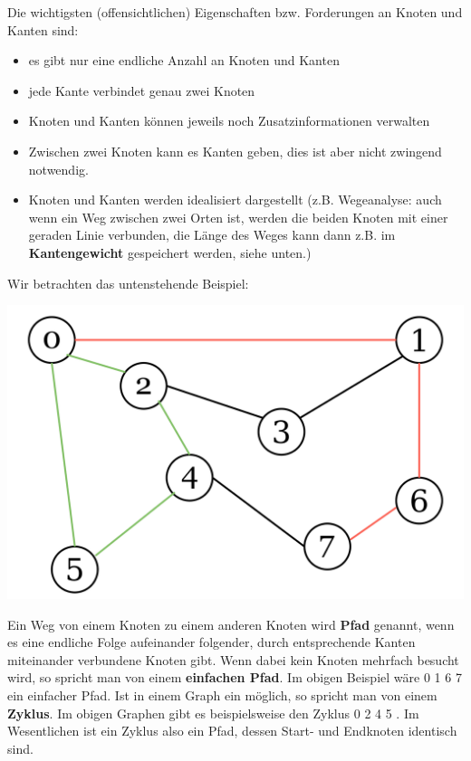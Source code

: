 \documentclass{article}
\begin{document}
Die wichtigsten (offensichtlichen) Eigenschaften bzw. Forderungen an Knoten und Kanten sind:
\begin{itemize}
    \item es gibt nur eine endliche Anzahl an Knoten und Kanten 
    \item jede Kante verbindet genau zwei Knoten 
    \item Knoten und Kanten können jeweils noch Zusatzinformationen verwalten
    \item Zwischen zwei Knoten kann es Kanten  geben, dies ist aber nicht zwingend notwendig. 
    \item Knoten und Kanten werden idealisiert dargestellt (z.B. Wegeanalyse: auch wenn ein Weg zwischen zwei Orten  ist, werden die beiden Knoten mit einer geraden Linie verbunden, die Länge des Weges kann dann z.B. im \textbf{Kantengewicht} gespeichert werden, siehe unten.)
\end{itemize}
Wir betrachten das untenstehende Beispiel:
\begin{center}
    \includegraphics[scale=0.25]{../../media/example_graph.png}
\end{center}
Ein Weg von einem Knoten zu einem anderen Knoten wird \textbf{Pfad} genannt, wenn es eine endliche Folge aufeinander folgender, durch entsprechende Kanten miteinander verbundene Knoten gibt. Wenn dabei kein Knoten mehrfach besucht wird, so spricht man von einem \textbf{einfachen Pfad}. Im obigen Beispiel wäre \color{re} 0 1 6 7 \color{black} ein einfacher Pfad. 
Ist in einem Graph ein  möglich, so spricht man von einem \textbf{Zyklus}. Im obigen Graphen gibt es beispielsweise den Zyklus \color{gre} 0 2 4 5 \color{black}. Im Wesentlichen ist ein Zyklus also ein Pfad, dessen Start- und Endknoten identisch sind.
\end{document}
